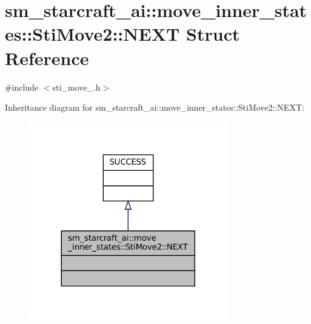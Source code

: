 \hypertarget{structsm__starcraft__ai_1_1move__inner__states_1_1StiMove2_1_1NEXT}{}\section{sm\+\_\+starcraft\+\_\+ai\+:\+:move\+\_\+inner\+\_\+states\+:\+:Sti\+Move2\+:\+:N\+E\+XT Struct Reference}
\label{structsm__starcraft__ai_1_1move__inner__states_1_1StiMove2_1_1NEXT}


{\ttfamily \#include $<$sti\+\_\+move\+\_.\+h$>$}



Inheritance diagram for sm\+\_\+starcraft\+\_\+ai\+:\+:move\+\_\+inner\+\_\+states\+:\+:Sti\+Move2\+:\+:N\+E\+XT\+:
\nopagebreak
\begin{figure}[H]
\begin{center}
\leavevmode
\includegraphics[width=245pt]{structsm__starcraft__ai_1_1move__inner__states_1_1StiMove2_1_1NEXT__inherit__graph}
\end{center}
\end{figure}


